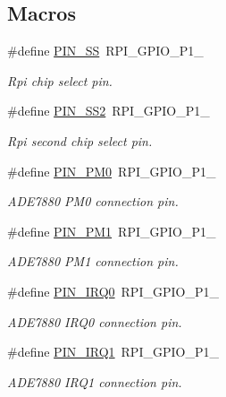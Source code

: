 \subsection*{Macros}
\begin{DoxyCompactItemize}
\item 
\#define \hyperlink{a00039_ab4b553591a495409d4f7cec4b6c3e754}{P\-I\-N\-\_\-\-S\-S}~R\-P\-I\-\_\-\-G\-P\-I\-O\-\_\-\-P1\-\_
\begin{DoxyCompactList}\small\item\em Rpi chip select pin. \end{DoxyCompactList}\item 
\#define \hyperlink{a00039_a8aa8d44cb9d876a244263493e0a2a7c5}{P\-I\-N\-\_\-\-S\-S2}~R\-P\-I\-\_\-\-G\-P\-I\-O\-\_\-\-P1\-\_
\begin{DoxyCompactList}\small\item\em Rpi second chip select pin. \end{DoxyCompactList}\item 
\#define \hyperlink{a00039_aef7884a448449013ba1f8b46b8df5c05}{P\-I\-N\-\_\-\-P\-M0}~R\-P\-I\-\_\-\-G\-P\-I\-O\-\_\-\-P1\-\_
\begin{DoxyCompactList}\small\item\em A\-D\-E7880 P\-M0 connection pin. \end{DoxyCompactList}\item 
\#define \hyperlink{a00039_a93e6f13f663a3ca8bcf6efe2022c9b78}{P\-I\-N\-\_\-\-P\-M1}~R\-P\-I\-\_\-\-G\-P\-I\-O\-\_\-\-P1\-\_
\begin{DoxyCompactList}\small\item\em A\-D\-E7880 P\-M1 connection pin. \end{DoxyCompactList}\item 
\#define \hyperlink{a00039_a99ed780c4dd8d2e01c5ff66064306abf}{P\-I\-N\-\_\-\-I\-R\-Q0}~R\-P\-I\-\_\-\-G\-P\-I\-O\-\_\-\-P1\-\_
\begin{DoxyCompactList}\small\item\em A\-D\-E7880 I\-R\-Q0 connection pin. \end{DoxyCompactList}\item 
\#define \hyperlink{a00039_a14204df3192ece77fc1b651c6625bc30}{P\-I\-N\-\_\-\-I\-R\-Q1}~R\-P\-I\-\_\-\-G\-P\-I\-O\-\_\-\-P1\-\_
\begin{DoxyCompactList}\small\item\em A\-D\-E7880 I\-R\-Q1 connection pin. \end{DoxyCompactList}\end{DoxyCompactItemize}
